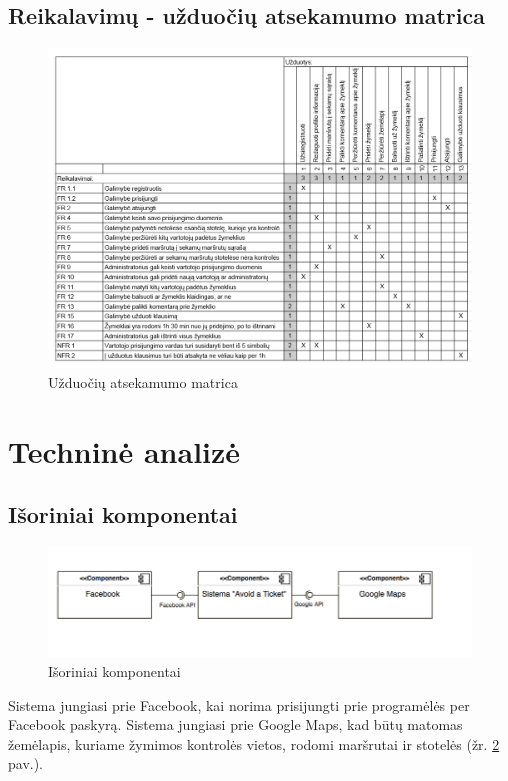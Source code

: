 \documentclass{VUMIFPSkursinis}
\begin{document}
\subsection{Reikalavimų - užduočių atsekamumo matrica}
	\begin{figure}[H]
				\centering
				\includegraphics[scale=0.4]{img/uzduociu_matrica}
				\caption{Užduočių atsekamumo matrica}
				\label{img:matrix}
			\end{figure}
			
\section{Techninė analizė}
\subsection{Išoriniai komponentai}

\begin{figure}[H]
	\centering
	\includegraphics[scale=0.7]{img/Isoriniai_komponentai}
	\caption{Išoriniai komponentai}
	\label{img:Išoriniai komponentai}
\end{figure}

Sistema jungiasi prie Facebook, kai norima prisijungti prie programėlės per Facebook paskyrą.
Sistema jungiasi prie Google Maps, kad būtų matomas žemėlapis, kuriame žymimos kontrolės vietos, rodomi maršrutai ir stotelės (žr. \ref{img:Išoriniai komponentai} pav.).
\end{document}

